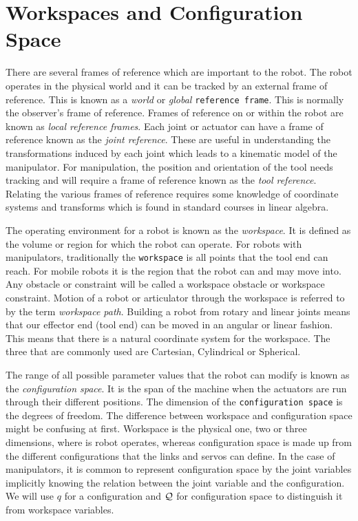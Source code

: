 \hypertarget{workspaces-and-configuration-space}{%
\section{Workspaces and Configuration
Space}\label{workspaces-and-configuration-space}}

There are several frames of reference which are important to the robot.
The robot operates in the physical world and it can be tracked by an
external frame of reference. This is known as a \emph{world} or
\emph{global} \texttt{reference\ frame}. This is normally the observer's
frame of reference. Frames of reference on or within the robot are known
as \emph{local reference frames}. Each joint or actuator can have a
frame of reference known as the \emph{joint reference}. These are useful
in understanding the transformations induced by each joint which leads
to a kinematic model of the manipulator. For manipulation, the position
and orientation of the tool needs tracking and will require a frame of
reference known as the \emph{tool reference}. Relating the various
frames of reference requires some knowledge of coordinate systems and
transforms which is found in standard courses in linear algebra.

The operating environment for a robot is known as the \emph{workspace}.
It is defined as the volume or region for which the robot can operate.
For robots with manipulators, traditionally the \texttt{workspace} is
all points that the tool end can reach. For mobile robots it is the
region that the robot can and may move into. Any obstacle or constraint
will be called a workspace obstacle or workspace constraint. Motion of a
robot or articulator through the workspace is referred to by the term
\emph{workspace path}. Building a robot from rotary and linear joints
means that our effector end (tool end) can be moved in an angular or
linear fashion. This means that there is a natural coordinate system for
the workspace. The three that are commonly used are Cartesian,
Cylindrical or Spherical.

The range of all possible parameter values that the robot can modify is
known as the \emph{configuration space}. It is the span of the machine
when the actuators are run through their different positions. The
dimension of the \texttt{configuration\ space} is the degrees of
freedom. The difference between workspace and configuration space might
be confusing at first. Workspace is the physical one, two or three
dimensions, where is robot operates, whereas configuration space is made
up from the different configurations that the links and servos can
define. In the case of manipulators, it is common to represent
configuration space by the joint variables implicitly knowing the
relation between the joint variable and the configuration. We will use
\(q\) for a configuration and \({\cal Q}\) for configuration space to
distinguish it from workspace variables.

